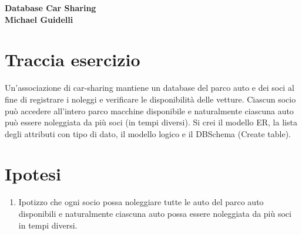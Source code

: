 \documentclass[12pt]{article}
\date{}
\begin{document}

\maketitle
\null \null \null \null \null \null
{\centering
    \huge\bfseries Database Car Sharing \\
    \Large\normalfont Michael Guidelli  \\
}

\clearpage


\section*{Traccia esercizio}

\noindent
Un’associazione di car-sharing mantiene un database del parco auto e dei soci al fine di registrare i
noleggi e verificare le disponibilità delle vetture.
Ciascun socio può accedere all’intero parco macchine disponibile e naturalmente ciascuna auto può
essere noleggiata da più soci (in tempi diversi).
Si crei il modello ER, la lista degli attributi con tipo di dato, il modello logico e il DBSchema
(Create table).

\clearpage


\renewcommand{\contentsname}{Indice \label{indice}}
\tableofcontents

\renewcommand{\listfigurename}{Lista delle figure}
\listoffigures

\renewcommand{\listtablename}{Liste Attributi}
\listoftables

\clearpage


\section{Ipotesi}
\begin{enumerate}
    \item Ipotizzo che ogni socio possa noleggiare tutte le auto del parco auto disponibili e naturalmente ciascuna auto possa essere noleggiata da più soci in tempi diversi.
\end{enumerate}

\clearpage
\end{document}
